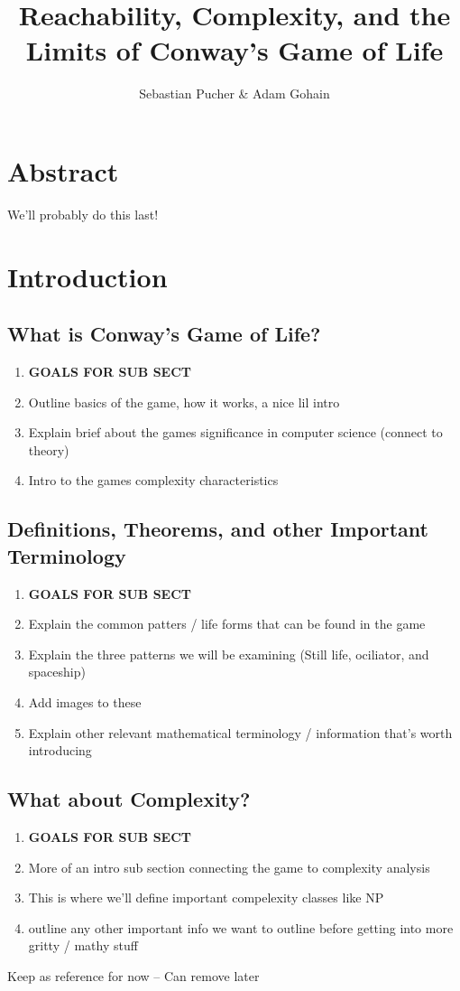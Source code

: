 \documentclass{article}
\title{Reachability, Complexity, and the Limits of Conway's Game of Life}
\author{Sebastian Pucher \& Adam Gohain}
\theoremstyle{definition}
\theoremstyle{plain}
\theoremstyle{plain}
\begin{document}
\maketitle

\tableofcontents

\newpage

\section{Abstract}
We'll probably do this last!
\section{Introduction}

\subsection{What is Conway's Game of Life?}

\begin{enumerate}
  \item[] \textbf{GOALS FOR SUB SECT}
  \item Outline basics of the game, how it works, a nice lil intro 
  \item Explain brief about the games significance in computer science (connect to theory)
  \item Intro to the games complexity characteristics 

\end{enumerate}
\subsection{Definitions, Theorems, and other Important Terminology}
\begin{enumerate}
  \item[] \textbf{GOALS FOR SUB SECT}
  \item Explain the common patters / life forms that can be found in the game
  \item Explain the three patterns we will be examining (Still life, ociliator, and spaceship)
  \item Add images to these 
  \item Explain other relevant mathematical terminology / information that's worth introducing 

\end{enumerate}

\subsection{What about Complexity?}
\begin{enumerate}
  \item[] \textbf{GOALS FOR SUB SECT}
  \item More of an intro sub section connecting the game to complexity analysis  
  \item This is where we'll define important compelexity classes like NP
  \item outline any other important info we want to outline before getting into more gritty / mathy stuff

\end{enumerate}
 Keep as reference for now -- Can remove later
\end{document}
